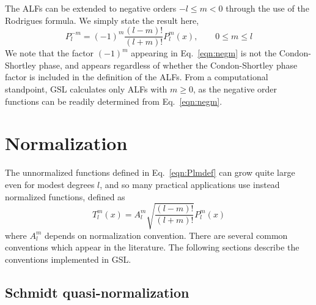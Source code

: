 \documentclass[12pt]{article}
\begin{document}
The ALFs can be extended to negative orders $-l \leq m < 0$ through
the use of the Rodrigues formula. We simply state the result here,
\begin{equation}
P_l^{-m} = (-1)^m \frac{(l-m)!}{(l+m)!} P_l^m(x), \qquad 0 \leq m \leq l
\label{eqn:negm}
\end{equation}
We note that the factor $(-1)^m$ appearing in Eq.~\eqref{eqn:negm}
is not the Condon-Shortley phase, and appears regardless of whether
the Condon-Shortley phase factor is included in the definition of the
ALFs. From a computational standpoint, GSL calculates only ALFs with
$m \geq 0$, as the negative order functions can be readily determined
from Eq.~\eqref{eqn:negm}.

\section{Normalization}

The unnormalized functions defined in Eq.~\eqref{eqn:Plmdef} can grow
quite large even for modest degrees $l$, and so many practical
applications use instead normalized functions, defined as
\begin{equation}
T_l^m(x) = A_l^m \sqrt{\frac{(l-m)!}{(l+m)!}} P_l^m(x)
\label{eqn:Tlm}
\end{equation}
where $A_l^m$ depends on normalization convention. There are several
common conventions which appear in the literature. The following
sections describe the conventions implemented in GSL.

\subsection{Schmidt quasi-normalization}
\end{document}
